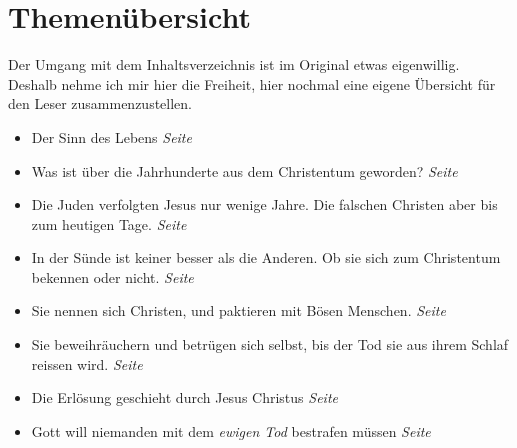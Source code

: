 \chapter{Themenübersicht} \label{ref:theme_nuebersicht}


Der Umgang mit dem Inhaltsverzeichnis ist im Original etwas eigenwillig. Deshalb
nehme ich mir hier die Freiheit, hier nochmal eine eigene Übersicht für den
Leser zusammenzustellen.


\begin{itemize}
 \item Der Sinn des Lebens
 \dotfill \textit{Seite~\pageref{ref:vorw_sinndes_lebens}}\\

 \item Was ist über die Jahrhunderte aus dem Christentum geworden?
 \dotfill \textit{Seite~\pageref{ref:01_02_urchristentum}}\\

 \item Die Juden verfolgten Jesus nur wenige Jahre. Die falschen Christen aber
bis zum heutigen Tage.
 \dotfill \textit{Seite~\pageref{ref:01_04_zweite_kreuzigung}}\\

 \item In der Sünde ist keiner besser als die Anderen. Ob sie sich zum
Christentum bekennen oder nicht.
 \dotfill \textit{Seite~\pageref{ref:01_05_in_suende_gleich}}\\

 \item Sie nennen sich Christen, und paktieren mit Bösen Menschen.
 \dotfill \textit{Seite~\pageref{ref:01_05_in_suende_verbinden}}\\

 \item Sie beweihräuchern und betrügen sich selbst, bis der Tod sie aus ihrem
Schlaf reissen wird.
 \dotfill \textit{Seite~\pageref{ref:01_07_selbstbetrug}}\\

 \item Die Erlösung geschieht durch Jesus Christus
 \dotfill \textit{Seite~\pageref{ref:01_10_jesus_der_erloeser}}\\

 \item Gott will niemanden mit dem \textit{ewigen Tod} bestrafen müssen
 \dotfill \textit{Seite~\pageref{ref:02_02_kein_gefallen_am_tod}}\\


\end{itemize}
